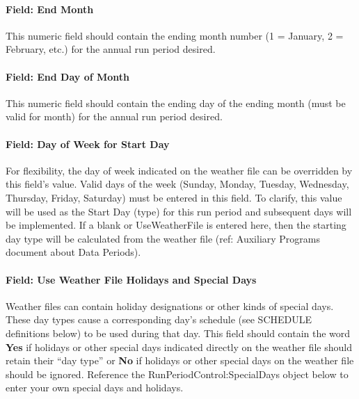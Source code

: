 \paragraph{Field: End Month}\label{field-end-month-1}

This numeric field should contain the ending month number (1 = January, 2 = February, etc.) for the annual run period desired.

\paragraph{Field: End Day of Month}\label{field-end-day-of-month-1}

This numeric field should contain the ending day of the ending month (must be valid for month) for the annual run period desired.

\paragraph{Field: Day of Week for Start Day}\label{field-day-of-week-for-start-day-2}

For flexibility, the day of week indicated on the weather file can be overridden by this field's value. Valid days of the week (Sunday, Monday, Tuesday, Wednesday, Thursday, Friday, Saturday) must be entered in this field. To clarify, this value will be used as the Start Day (type) for this run period and subsequent days will be implemented. If a blank or UseWeatherFile is entered here, then the starting day type will be calculated from the weather file (ref: Auxiliary Programs document about Data Periods).

\paragraph{Field: Use Weather File Holidays and Special Days}\label{field-use-weather-file-holidays-and-special-days}

Weather files can contain holiday designations or other kinds of special days. These day types cause a corresponding day's schedule (see SCHEDULE definitions below) to be used during that day. This field should contain the word \textbf{Yes} if holidays or other special days indicated directly on the weather file should retain their ``day type'' or \textbf{No} if holidays or other special days on the weather file should be ignored. Reference the RunPeriodControl:SpecialDays object below to enter your own special days and holidays.

